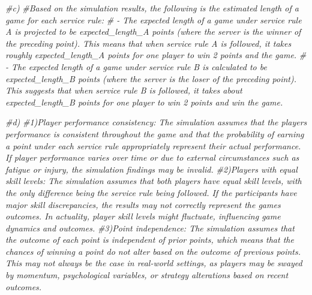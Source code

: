 \documentclass[
]{article}
\newenvironment{Shaded}{\begin{snugshade}}{\end{snugshade}}
\newcommand{\CommentTok}[1]{\textcolor[rgb]{0.56,0.35,0.01}{\textit{#1}}}
\begin{document}
\begin{Shaded}
\begin{Highlighting}[]
\CommentTok{\#c)}
\CommentTok{\#Based on the simulation results, the following is the estimated length of a game for each service rule:}
\CommentTok{\# {-} The expected length of a game under service rule A is projected to be expected\_length\_A points (where the server is the winner of the preceding point). This means that when service rule A is followed, it takes roughly expected\_length\_A points for one player to win 2 points and the game.}
\CommentTok{\# {-} The expected length of a game under service rule B is calculated to be expected\_length\_B points (where the server is the loser of the preceding point). This suggests that when service rule B is followed, it takes about expected\_length\_B points for one player to win 2 points and win the game.}

\CommentTok{\#d)}
\CommentTok{\#1)Player performance consistency: The simulation assumes that the players\textquotesingle{} performance is consistent throughout the game and that the probability of earning a point under each service rule appropriately represent their actual performance. If player performance varies over time or due to external circumstances such as fatigue or injury, the simulation findings may be invalid.}
\CommentTok{\#2)Players with equal skill levels: The simulation assumes that both players have equal skill levels, with the only difference being the service rule being followed. If the participants have major skill discrepancies, the results may not correctly represent the game\textquotesingle{}s outcomes. In actuality, player skill levels might fluctuate, influencing game dynamics and outcomes.}
\CommentTok{\#3)Point independence: The simulation assumes that the outcome of each point is independent of prior points, which means that the chances of winning a point do not alter based on the outcome of previous points. This may not always be the case in real{-}world settings, as players may be swayed by momentum, psychological variables, or strategy alterations based on recent outcomes.}
\end{Highlighting}
\end{Shaded}
\end{document}
